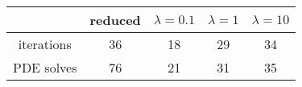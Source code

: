 \begin{tabular}{ccccc}
& reduced & $\lambda = 0.1$ & $\lambda = 1$ & $\lambda = 10$ \\
\hline
iterations & 36 & 18 & 29 & 34 \\
PDE solves & 76 & 21 & 31 & 35 \\
\hline
\end{tabular}
